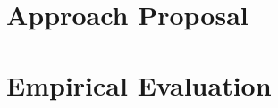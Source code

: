 \documentclass[
	12pt,				%
	openright,		nsubseteq	%
	twoside,			%
	a4paper,			%
	english,			%
	french,				%
	spanish,			%
	brazil				%
	]{abntex2}
\begin{document}



\part{Approach Proposal}


\part{Empirical Evaluation}









\end{document}
